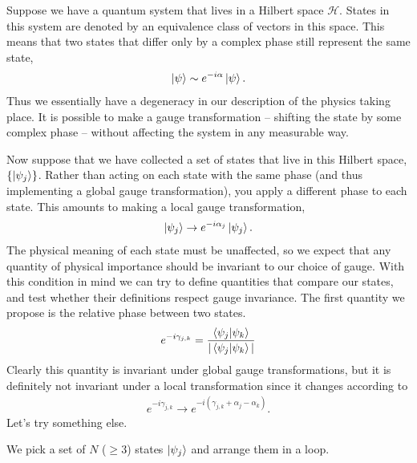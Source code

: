 Suppose we have a quantum system that lives in a Hilbert space $\mathcal{H}$. States in this system are denoted by an equivalence class of vectors in this space. This means that two states that differ only by a complex phase still represent the same state,
\begin{align}
    \ket{\psi} \sim e^{-i\alpha}\ket{\psi}.
\end{align}
Thus we essentially have a degeneracy in our description of the physics taking place. It is possible to make a gauge transformation -- shifting the state by some complex phase -- without affecting the system in any measurable way.\par
Now suppose that we have collected a set of states that live in this Hilbert space, $\{ \ket{\psi_j}\}$. Rather than acting on each state with the same phase (and thus implementing a global gauge transformation), you apply a different phase to each state. This amounts to making a local gauge transformation,
\begin{align}
    \ket{\psi_j} \rightarrow e^{-i\alpha_j}\ket{\psi_j}.
\end{align}
The physical meaning of each state must be unaffected, so we expect that any quantity of physical importance should be invariant to our choice of gauge. With this condition in mind we can try to define quantities that compare our states, and test whether their definitions respect gauge invariance. The first quantity we propose is the relative phase between two states.
\begin{align}
    e^{-i\gamma_{j,k}} = \frac{\braket{\psi_j|\psi_k}}{|\braket{\psi_j|\psi_k}|}
\end{align}
Clearly this quantity is invariant under global gauge transformations, but it is definitely not invariant under a local transformation since it changes according to
\begin{align}
    e^{-i\gamma_{j,k}} \rightarrow e^{-i(\gamma_{j,k}+\alpha_j - \alpha_k)}.
\end{align}
Let's try something else.\par
We pick a set of $N$ ($\geq 3$) states $\ket{\psi_j}$ and arrange them in a loop.
